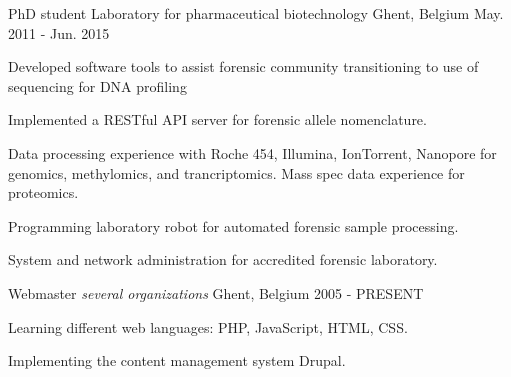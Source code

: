 \begin{cventries}
  \cventry
    {PhD student } %
    {Laboratory for pharmaceutical biotechnology} %
    {Ghent, Belgium} %
    {May. 2011 - Jun. 2015} %
    {
      \begin{cvitems} %
        \item {Developed software tools to assist forensic community
            transitioning to use of sequencing for DNA profiling}
        \item {Implemented a RESTful API server for forensic allele
            nomenclature.}
        \item {Data processing experience with Roche 454, Illumina,
            IonTorrent, Nanopore for genomics, methylomics, and
            trancriptomics. Mass spec data experience for proteomics.}
        \item {Programming laboratory robot for automated forensic
            sample processing.}
        \item {System and network administration for accredited
            forensic laboratory.}
      \end{cvitems}
    }

  \cventry
    {Webmaster} %
    {\emph{several organizations}} %
    {Ghent, Belgium} %
    {2005 - PRESENT} %
    {
      \begin{cvitems} %
        \item {Learning different web languages: PHP, JavaScript, HTML, CSS.}
        \item {Implementing the content management system Drupal.}
      \end{cvitems}
    }

\end{cventries}
